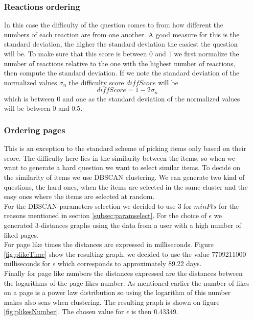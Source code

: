 \subsubsection{Reactions ordering}
In this case the difficulty of the question comes to from how different the numbers of each reaction are from one another. A good measure for this is the standard deviation, the higher the standard deviation the easiest the question will be. To make sure that this score is between 0 and 1 we first normalize the number of reactions relative to the one with the highest number of reactions, then compute the standard deviation. If we note the standard deviation of the normalized values $\sigma_n$ the difficulty score $diffScore$ will be $$diffScore = 1 - 2 \sigma_n$$ which is between 0 and one as the standard deviation of the normalized values will be between 0 and 0.5.
\subsubsection{Ordering pages}\label{subsubsec:orderpages}
This is an exception to the standard scheme of picking items only based on their score. The difficulty here lies in the similarity between the items, so when we want to generate a hard question we want to select similar items. To decide on the similarity of items we use DBSCAN clustering. We can generate two kind of questions, the hard ones, when the items are selected in the same cluster and the easy ones where the items are selected at random.\\
For the DBSCAN parameters selection we decided to use 3 for $minPts$ for the reasons mentioned in section \ref{subsec:paramselect}. For the choice of $\epsilon$ we generated 3-distances graphs using the data from a user with a high number of liked pages.\\
For page like times the distances are expressed in milliseconds. Figure \ref{fig:plikeTime} show the resulting graph, we decided to use the value 7709211000 milliseconds for $\epsilon$ which corresponds to approximately 89.22 days.\\
Finally for page like numbers the distances expressed are the distances between the logarithms of the page likes number. As mentioned earlier the number of likes on a page is a power law distribution so using the logarithm of this number makes also sens when clustering. The resulting graph is shown on figure \ref{fig:plikesNumber}. The chosen value for $\epsilon$ is then 0.43349.

